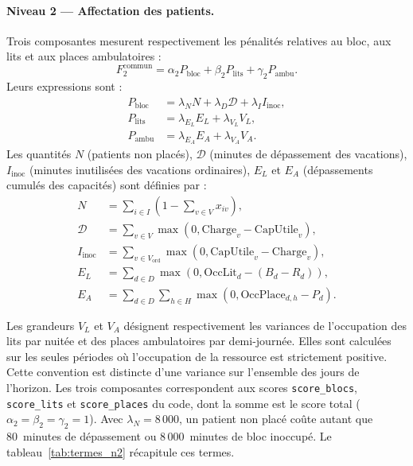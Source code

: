 \documentclass[11pt,a4paper]{article}
\begin{document}
\paragraph{Niveau 2 --- Affectation des patients.}
Trois composantes mesurent respectivement les pénalités relatives au bloc, aux lits et aux places ambulatoires :
\begin{equation}
\boxed{F_2^{\mathrm{commun}}=\alpha_2P_{\mathrm{bloc}}+\beta_2P_{\mathrm{lits}}+\gamma_2P_{\mathrm{ambu}}.}
\label{eq:F2}
\end{equation}
Leurs expressions sont :
\begin{align}
P_{\mathrm{bloc}}&=\lambda_N N+\lambda_D\mathcal{D}+\lambda_I I_{\mathrm{inoc}},\\
P_{\mathrm{lits}}&=\lambda_{E_L}E_L+\lambda_{V_L}V_L,\\
P_{\mathrm{ambu}}&=\lambda_{E_A}E_A+\lambda_{V_A}V_A.
\end{align}
Les quantités $N$ (patients non placés), $\mathcal{D}$ (minutes de dépassement des vacations), $I_{\mathrm{inoc}}$ (minutes inutilisées des vacations ordinaires), $E_L$ et $E_A$ (dépassements cumulés des capacités) sont définies par :
\begin{align}
N&=\sum_{i\in I}\left(1-\sum_{v\in V}x_{iv}\right),\\
\mathcal{D}&=\sum_{v\in V}\max(0,\mathrm{Charge}_v-\mathrm{CapUtile}_v),\\
I_{\mathrm{inoc}}&=\sum_{v\in V_{\mathrm{ord}}}\max(0,\mathrm{CapUtile}_v-\mathrm{Charge}_v),\\
E_L&=\sum_{d\in D}\max(0,\mathrm{OccLit}_d-(B_d-R_d)),\\
E_A&=\sum_{d\in D}\sum_{h\in H}\max(0,\mathrm{OccPlace}_{d,h}-P_d).
\end{align}

Les grandeurs $V_L$ et $V_A$ désignent respectivement
les variances de l'occupation des lits par nuitée
et des places ambulatoires par demi-journée.
Elles sont calculées sur les seules périodes où
l'occupation de la ressource est strictement positive.
 Cette convention est distincte d'une variance sur l'ensemble des jours de l'horizon. Les trois composantes correspondent aux scores \texttt{score\_blocs}, \texttt{score\_lits} et \texttt{score\_places} du code, dont la somme est le score total ($\alpha_2=\beta_2=\gamma_2=1$). Avec $\lambda_N=8\,000$, un patient non placé coûte autant que 80~minutes de dépassement ou 8\,000~minutes de bloc inoccupé. Le tableau~\ref{tab:termes_n2} récapitule ces termes.
\end{document}
